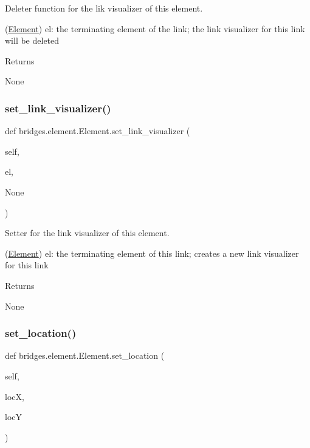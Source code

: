 Deleter function for the lik visualizer of this element. 

(\mbox{\hyperlink{classbridges_1_1element_1_1_element}{Element}}) el\+: the terminating element of the link; the link visualizer for this link will be deleted \begin{DoxyReturn}{Returns}


None 
\end{DoxyReturn}
\mbox{\label{classbridges_1_1element_1_1_element_afe94604116e0dec9a60a4ea54a462323}} 
\subsubsection{\texorpdfstring{set\+\_\+link\+\_\+visualizer()}{set\_link\_visualizer()}}
{\footnotesize\ttfamily def bridges.\+element.\+Element.\+set\+\_\+link\+\_\+visualizer (\begin{DoxyParamCaption}\item[{}]{self,  }\item[{}]{el,  }\item[{}]{None }\end{DoxyParamCaption})}



Setter for the link visualizer of this element. 

(\mbox{\hyperlink{classbridges_1_1element_1_1_element}{Element}}) el\+: the terminating element of this link; creates a new link visualizer for this link \begin{DoxyReturn}{Returns}


None 
\end{DoxyReturn}
\mbox{\label{classbridges_1_1element_1_1_element_aa1387621f7afa6b6f6acd052a1126320}} 
\subsubsection{\texorpdfstring{set\+\_\+location()}{set\_location()}}
{\footnotesize\ttfamily def bridges.\+element.\+Element.\+set\+\_\+location (\begin{DoxyParamCaption}\item[{}]{self,  }\item[{}]{locX,  }\item[{}]{locY }\end{DoxyParamCaption})}



